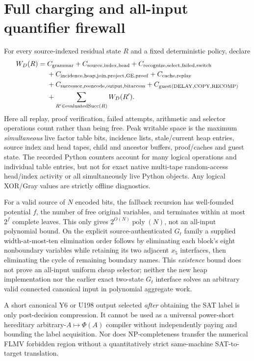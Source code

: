 \documentclass[11pt]{article}
\begin{document}
\section{Full charging and all-input quantifier firewall}
For every source-indexed residual state $R$ and a fixed deterministic policy, declare
\[
\begin{split}
W_D(R)={}&C_{\rm grammar}+C_{\rm source,index,head}+C_{\rm recognize,select,failed,switch}\\
&+C_{\rm incidence,heap,join,project,GE,proof}+C_{\rm cache,replay}\\
&+C_{\rm successor,reencode,output,bitaccess}+C_{\rm guest(DELAY,COPY,RECOMP)}\\
&+\sum_{R'\in\operatorname{evaluatedSucc}(R)} W_D(R').
\end{split}
\]
Here all replay, proof verification, failed attempts, arithmetic and selector operations count rather than being free. Peak writable space is the maximum \emph{simultaneous} live factor table bits, incidence lists, stale/current heap entries, source index and head tapes, child and ancestor buffers, proof/caches and guest state. The recorded Python counters account for many logical operations and individual table entries, but not for exact native multi-tape random-access head/index activity or all simultaneously live Python objects. Any logical XOR/Gray values are strictly offline diagnostics.

For a valid source of $N$ encoded bits, the fallback recursion has well-founded potential $f$, the number of free original variables, and terminates within at most $2^f$ complete leaves. This only gives $2^{O(N)}\operatorname{poly}(N)$, not an all-input polynomial bound. On the explicit source-authenticated $G_t$ family a supplied width-at-most-ten elimination order follows by eliminating each block's eight nonboundary variables while retaining its two adjacent $x_5$ interfaces, then eliminating the cycle of remaining boundary names. This \emph{existence} bound does not prove an all-input uniform cheap selector; neither the new heap implementation nor the earlier exact two-state $G_t$ interface solves an arbitrary valid connected canonical input in polynomial aggregate work.

A short canonical Y6 or U198 output selected \emph{after} obtaining the SAT label is only post-decision compression. It cannot be used as a universal power-short hereditary arbitrary-$A\mapsto\Phi(A)$ compiler without independently paying and bounding the label acquisition. Nor does NP-completeness transfer the numerical FLMV forbidden region without a quantitatively strict same-machine SAT-to-target translation.
\end{document}

